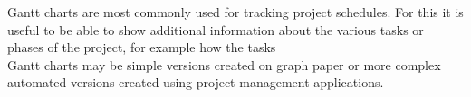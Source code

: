 Gantt charts are most commonly used for tracking project schedules. For this it is useful to be able to show additional information about the various tasks or phases of the project, for example how the tasks \\
Gantt charts may be simple versions created on graph paper or more complex automated versions created using project management applications.